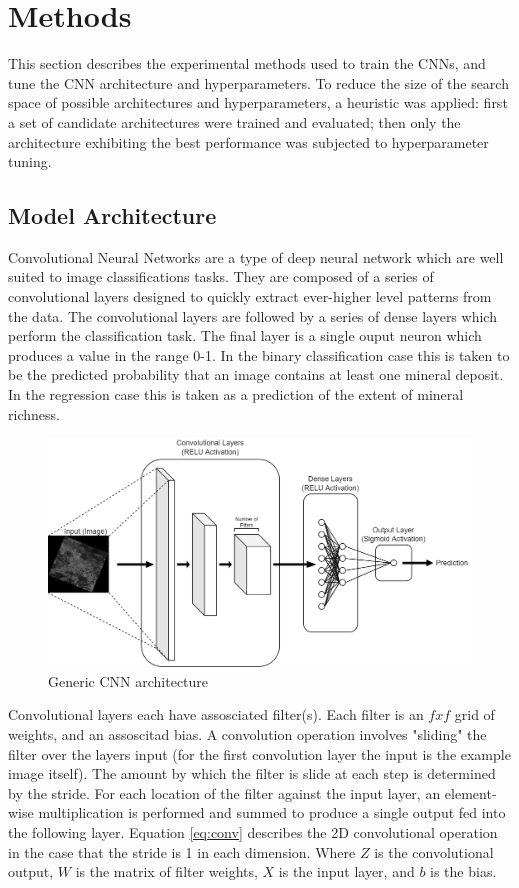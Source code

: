 \documentclass[10pt]{article}
\begin{document}
\section{Methods}

This section describes the experimental methods used to train the CNNs,
and tune the CNN architecture and hyperparameters. To reduce the size of 
the search space of possible architectures and hyperparameters, a heuristic
was applied: first a set of candidate architectures were trained and evaluated;
then only the architecture exhibiting the best performance was subjected to
hyperparameter tuning.

\subsection{Model Architecture}

Convolutional Neural Networks are a type of deep neural network which are 
well suited to image classifications tasks. They are composed of a series
of convolutional layers designed to quickly extract ever-higher level patterns
from the data. The convolutional layers are followed by a series of dense
layers which perform the classification task. The final layer is a single ouput
neuron which produces a value in the range 0-1. In the binary classification case
this is taken to be the predicted probability that an image contains at least one
mineral deposit. In the regression case this is taken as a prediction of the extent
of mineral richness.

\begin{figure}[ht]
  \centering
  \includegraphics[width=0.75\linewidth]{cnn.png}
  \caption{Generic CNN architecture}
  \label{fig:cnn}
\end{figure}

Convolutional layers each have assosciated filter(s). Each filter is an $fxf$ grid
of weights, and an assoscitad bias. A convolution operation involves "sliding"
the filter over the layers input (for the first convolution layer the input is the
example image itself). The amount by which the filter is slide at each step is determined
by the stride. For each location of the filter against the input layer, an element-wise
multiplication is performed and summed to produce a single output fed into the following layer.
Equation \ref{eq:conv} describes the 2D convolutional operation in the case that the
stride is 1 in each dimension. Where $Z$ is the convolutional output, $W$ is the
matrix of filter weights, $X$ is the input layer, and $b$ is the bias.
\end{document}
